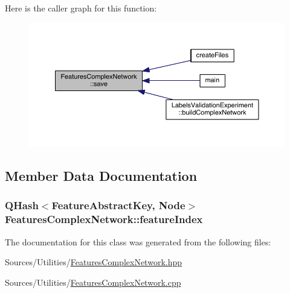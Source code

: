 Here is the caller graph for this function\+:
\nopagebreak
\begin{figure}[H]
\begin{center}
\leavevmode
\includegraphics[width=350pt]{class_features_complex_network_a59981f76044a2b98eda4e69a20844ba0_icgraph}
\end{center}
\end{figure}




\subsection{Member Data Documentation}
\hypertarget{class_features_complex_network_a7564b04733dffbb9176281c6d87722da}{
\subsubsection[{feature\+Index}]{\setlength{\rightskip}{0pt plus 5cm}Q\+Hash$<${\bf Feature\+Abstract\+Key}, Node$>$ Features\+Complex\+Network\+::feature\+Index\hspace{0.3cm}{\ttfamily [private]}}}\label{class_features_complex_network_a7564b04733dffbb9176281c6d87722da}


The documentation for this class was generated from the following files\+:\begin{DoxyCompactItemize}
\item 
Sources/\+Utilities/\hyperlink{_features_complex_network_8hpp}{Features\+Complex\+Network.\+hpp}\item 
Sources/\+Utilities/\hyperlink{_features_complex_network_8cpp}{Features\+Complex\+Network.\+cpp}\end{DoxyCompactItemize}
